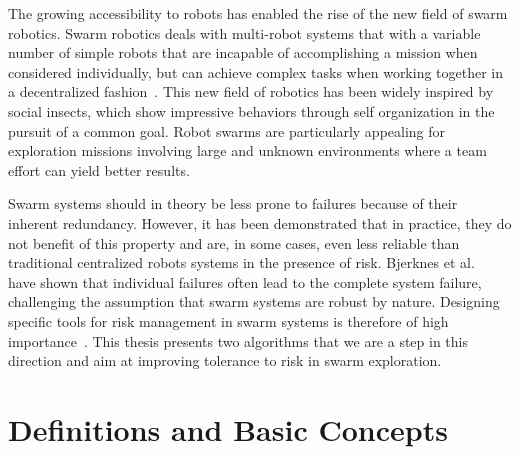 
\label{sec:Introduction} 
The growing accessibility to robots has enabled the rise of the new field of swarm robotics. Swarm robotics deals with multi-robot systems that with a variable number of simple robots that are incapable of accomplishing a mission when considered individually, but can achieve complex tasks when working together in a decentralized fashion~\cite{sahin2005swarm}. This new field of robotics has been widely inspired by social insects, which show impressive behaviors through self organization in the pursuit of a common goal. Robot swarms are particularly appealing for exploration missions involving large and unknown environments where a team effort can yield better results.

Swarm systems should in theory be less prone to failures because of their inherent redundancy. However, it has been demonstrated that in practice, they do not benefit of this property and are, in some cases, even less reliable than traditional centralized robots systems in the presence of risk. Bjerknes et al.~\cite{bjerknes2013fault} have shown that individual failures often lead to the complete system failure, challenging the assumption that swarm systems are robust by nature. Designing specific tools for risk management in swarm systems is therefore of high importance~\cite{prorok2021beyond}. This thesis
presents two algorithms that we are a step in this direction and aim at improving tolerance to risk in swarm exploration.

\section{Definitions and Basic Concepts}

